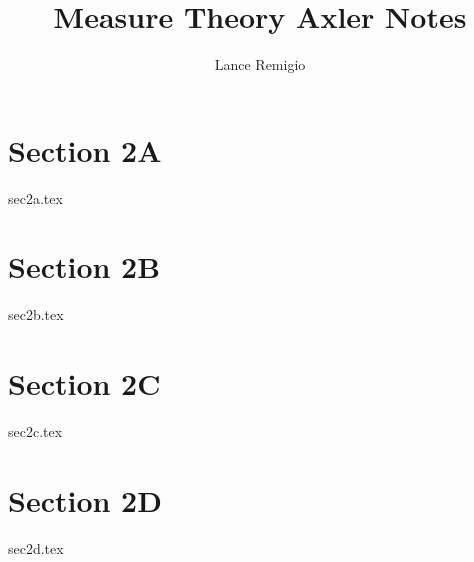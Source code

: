 \documentclass[a4paper]{article}
\title{Measure Theory Axler Notes}
\author{Lance Remigio}
\begin{document}
\maketitle
\tableofcontents

\section{Section 2A}

{sec2a.tex}

\section{Section 2B}

{sec2b.tex}

\section{Section 2C}

{sec2c.tex}

\section{Section 2D}

{sec2d.tex}
\end{document}
